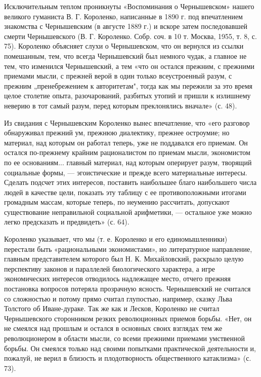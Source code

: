 Исключительным теплом проникнуты  «Воспоминания о Чернышевском» нашего
великого  гуманиста  В.  Г.  Короленко,   написанные  в  1890  г.  под
впечатлением знакомства  с Чернышевским (в  августе 1889 г.)  и вскоре
затем последовавшей смерти Чернышевского  (В. Г. Короленко. Собр. соч.
в  10 т.  Москва, 1955,  т.  8, с.  75). Короленко  объясняет слухи  о
Чернышевском, что  он вернулся из  ссылки помешанным, тем,  что всегда
Чернышевский  был  немного чудак,  а  главное  не тем,  что  изменился
Чернышевский,  а тем  «что  он остался  прежним,  с прежними  приемами
мысли, с  прежней верой в  один только всеустроенный разум,  с прежним
„пренебрежением к  авторитетам", тогда  как мы  пережили за  это время
целое  столетие  опыта,  разочарований,  разбитых утопий  и  пришли  к
излишнему  неверию  в  тот  самый разум,  перед  которым  преклонялись
вначале» (с. 48).

Из  свидания  с Чернышевским  Короленко  вынес  впечатление, что  «его
разговор   обнаруживал  прежний   ум,   прежнюю  диалектику,   прежнее
остроумие;  но  материал,  над  которым  он  работал  теперь,  уже  не
поддавался его  приемам. Он остался по-прежнему  крайним рационалистом
по приемам  мысли, экономистом  по ее основаниям...  главный материал,
над   которым  оперирует   разум,  творящий   социальные  формы,   ---
эгоистические и  прежде всего  материальные интересы.  Сделать подсчет
этих интересов,  поставить наибольшее благо наибольшего  числа людей в
качестве  цели, показать  эту  таблицу с  ее противоположными  итогами
громадным массам,  которые теперь,  по неумению  рассчитать, допускают
существование  неправильной социальной  арифметики, ---  остальное уже
можно легко предсказать и предвидеть» (с. 64).

Короленко указывает,  что мы (т.  е. Короленко и  его единомышленники)
перестали   быть   «рациональными   экономистами»,   но   литературное
направление, главным  представителем которого был Н.  К. Михайловский,
раскрыло  целую   перспективу  законов  и   параллелей  биологического
характера, а игре экономических интересов отводилось надлежащее место,
отчего  прежняя  постановка   вопросов  потеряла  прозрачную  ясность.
Чернышевский  не   считался  со  сложностью  и   потому  прямо  считал
глупостью,  например, сказку  Льва  Толстого об  Иване-дураке. Так  же
как  и Лесков,  Короленко не  считал Чернышевского  сторонником резких
революционных  приемов  борьбы. «Нет,  он  не  смеялся над  прошлым  и
остался  в основных  своих взглядах  тем же  революционером в  области
мысли, со всеми прежними приемами умственной борьбы. Он смеялся только
над своими попытками практической деятельности  и, пожалуй, не верил в
близость и плодотворность общественного катаклизма» (с. 73).

